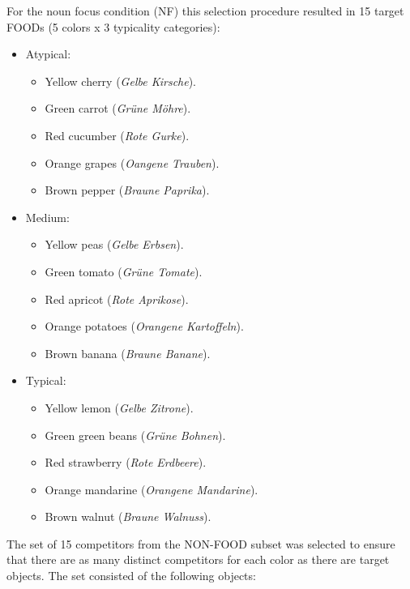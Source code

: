 \documentclass[
]{article}
\providecommand{\tightlist}{%
  \setlength{\itemsep}{0pt}\setlength{\parskip}{0pt}}
\begin{document}
For the noun focus condition (NF) this selection procedure resulted in 15 target FOODs (5 colors x 3 typicality categories):

\begin{itemize}
\tightlist
\item
  Atypical:

  \begin{itemize}
  \tightlist
  \item
    Yellow cherry (\emph{Gelbe Kirsche}).
  \item
    Green carrot (\emph{Grüne Möhre}).
  \item
    Red cucumber (\emph{Rote Gurke}).
  \item
    Orange grapes (\emph{Oangene Trauben}).
  \item
    Brown pepper (\emph{Braune Paprika}).
  \end{itemize}
\item
  Medium:

  \begin{itemize}
  \tightlist
  \item
    Yellow peas (\emph{Gelbe Erbsen}).
  \item
    Green tomato (\emph{Grüne Tomate}).
  \item
    Red apricot (\emph{Rote Aprikose}).
  \item
    Orange potatoes (\emph{Orangene Kartoffeln}).
  \item
    Brown banana (\emph{Braune Banane}).
  \end{itemize}
\item
  Typical:

  \begin{itemize}
  \tightlist
  \item
    Yellow lemon (\emph{Gelbe Zitrone}).
  \item
    Green green beans (\emph{Grüne Bohnen}).
  \item
    Red strawberry (\emph{Rote Erdbeere}).
  \item
    Orange mandarine (\emph{Orangene Mandarine}).
  \item
    Brown walnut (\emph{Braune Walnuss}).
  \end{itemize}
\end{itemize}

The set of 15 competitors from the NON-FOOD subset was selected to ensure that there are as many distinct competitors for each color as there are target objects.
The set consisted of the following objects:
\end{document}
